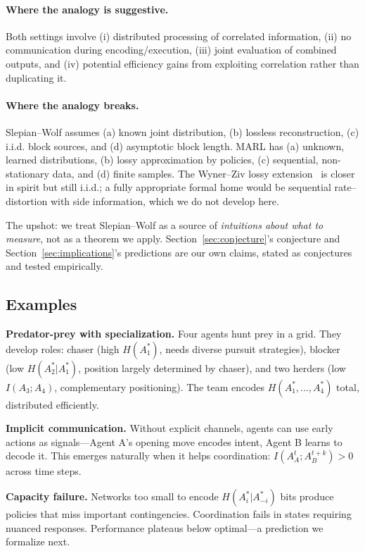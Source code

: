 \documentclass[10pt, letterpaper]{article}
\begin{document}
\paragraph{Where the analogy is suggestive.} Both settings involve (i) distributed processing of correlated information, (ii) no communication during encoding/execution, (iii) joint evaluation of combined outputs, and (iv) potential efficiency gains from exploiting correlation rather than duplicating it.

\paragraph{Where the analogy breaks.} Slepian--Wolf assumes (a) known joint distribution, (b) lossless reconstruction, (c) i.i.d. block sources, and (d) asymptotic block length. MARL has (a) unknown, learned distributions, (b) lossy approximation by policies, (c) sequential, non-stationary data, and (d) finite samples. The Wyner--Ziv lossy extension~\cite{wyner1976} is closer in spirit but still i.i.d.; a fully appropriate formal home would be sequential rate--distortion with side information, which we do not develop here.

The upshot: we treat Slepian--Wolf as a source of \emph{intuitions about what to measure}, not as a theorem we apply. Section~\ref{sec:conjecture}'s conjecture and Section~\ref{sec:implications}'s predictions are our own claims, stated as conjectures and tested empirically.

\subsection{Examples}

\textbf{Predator-prey with specialization.} Four agents hunt prey in a grid. They develop roles: chaser (high $H(A_1^*)$, needs diverse pursuit strategies), blocker (low $H(A_2^*|A_1^*)$, position largely determined by chaser), and two herders (low $I(A_3; A_4)$, complementary positioning). The team encodes $H(A_1^*, \ldots, A_4^*)$ total, distributed efficiently.

\textbf{Implicit communication.} Without explicit channels, agents can use early actions as signals---Agent A's opening move encodes intent, Agent B learns to decode it. This emerges naturally when it helps coordination: $I(A_A^t; A_B^{t+k}) > 0$ across time steps.

\textbf{Capacity failure.} Networks too small to encode $H(A_i^*|A_{-i}^*)$ bits produce policies that miss important contingencies. Coordination fails in states requiring nuanced responses. Performance plateaus below optimal---a prediction we formalize next.
\end{document}
